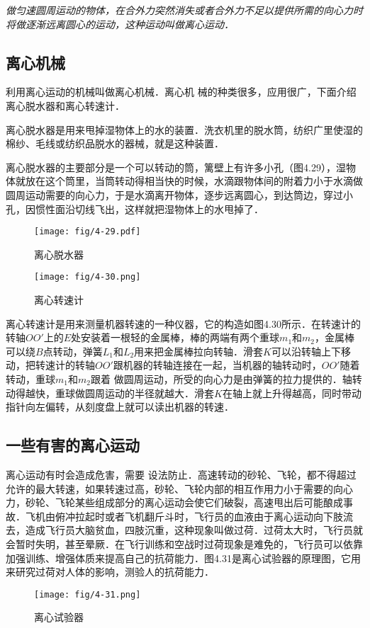 \textit{做匀速圆周运动的物体，在合外力突然消失或者合外力不足以提供所需的向心力时将做逐渐远离圆心的运动，这种运动叫做离心运动．}

\subsection{离心机械}

利用离心运动的机械叫做离心机械．离心机
械的种类很多，应用很广，下面介绍离心脱水器和离心转速计．

离心脱水器是用来甩掉湿物体上的水的装置．洗衣机里的脱水筒，纺织广里使湿的棉纱、毛线或纺织品脱水的器械，就是这种装置．

离心脱水器的主要部分是一个可以转动的筒，篱壁上有许多小孔（图4.29），湿物体就放在这个筒里，当筒转动得相当快的时候，水滴跟物体间的附着力小于水滴做圆周运动需要的向心力，于是水滴离开物体，逐步远离圆心，到达筒边，穿过小孔，因惯性面沿切线飞出，这样就把湿物体上的水甩掉了．

\begin{figure}[htp]\centering
	\begin{minipage}[t]{0.48\textwidth}
		\centering
\texttt{[image: fig/4-29.pdf]}
\caption{离心脱水器}
	\end{minipage}
	\begin{minipage}[t]{0.48\textwidth}
\centering\texttt{[image: fig/4-30.png]}
\caption{离心转速计}
	\end{minipage}
\end{figure}

离心转速计是用来测量机器转速的一种仪器，它的构造如图4.30所示．在转速计的转轴$OO'$上的$E$处安装着一根轻的金属棒，棒的两端有两个重球$m_1$和$m_2$，金属棒可以绕$B$点转动，弹簧$L_1$和$L_2$用来把金属棒拉向转轴．滑套$K$可以沿转轴上下移动，把转速计的转轴$OO'$跟机器的转轴连接在一起，当机器的轴转动时，$OO'$随着转动，重球$m_1$和$m_2$跟着
做圆周运动，所受的向心力是由弹簧的拉力提供的．轴转动得越快，重球做圆周运动的半径就越大．滑套$K$在轴上就上升得越高，同时带动指针向左偏转，从刻度盘上就可以读出机器的转速．


\subsection{一些有害的离心运动} 

离心运动有时会造成危害，需要
设法防止．高速转动的砂轮、飞轮，都不得超过允许的最大转速，如果转速过高，砂轮、飞轮内部的相互作用力小于需要的向心力，砂轮、飞轮某些组成部分的离心运动会使它们破裂，高速甩出后可能酿成事故．飞机由俯冲拉起时或者飞机翻斤斗时，飞行员的血液由于离心运动向下肢流去，造成飞行员大脑贫血，四肢沉重，这种现象叫做过荷．过荷太大时，飞行员就会暂时失明，甚至晕厥．在飞行训练和空战时过荷现象是难免的，飞行员可以依靠加强训练、增强体质来提高自己的抗荷能力．图4.31是离心试验器的原理图，它用来研究过荷对人体的影响，测验人的抗荷能力．
\begin{figure}[htp]
\centering\texttt{[image: fig/4-31.png]}
\caption{离心试验器}
\end{figure}

